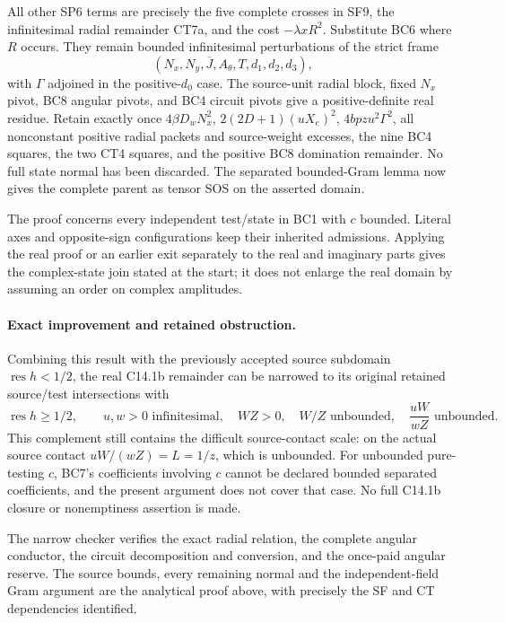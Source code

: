 All other SP6 terms are precisely the five complete crosses in SF9,
the infinitesimal radial remainder CT7a, and the cost
$-\lambda xR^2$. Substitute BC6 where $R$ occurs. They remain
bounded infinitesimal perturbations of the strict frame
\[
 (N_x,N_y,\overline J,A_\theta,T,d_1,d_2,d_3),
 \tag{BC10}
\]
with $\Gamma$ adjoined in the positive-$d_0$ case. The source-unit
radial block, fixed $N_x$ pivot, BC8 angular pivots, and BC4 circuit
pivots give a positive-definite real residue. Retain exactly once
$4\beta D_wN_x^2$, $2(2D+1)(uX_e)^2$, $4bpzu^2\Gamma^2$,
all nonconstant positive radial packets and source-weight excesses,
the nine BC4 squares, the two CT4 squares, and the positive BC8
domination remainder. No full state normal has been discarded.
The separated bounded-Gram lemma now gives the complete parent
as tensor SOS on the asserted domain.

The proof concerns every independent test/state in BC1 with $c$
bounded. Literal axes and opposite-sign configurations keep their
inherited admissions. Applying the real proof or an earlier exit
separately to the real and imaginary parts gives the complex-state
join stated at the start; it does not enlarge the real domain by
assuming an order on complex amplitudes.

\paragraph{Exact improvement and retained obstruction.}
Combining this result with the previously accepted source subdomain
$\operatorname{res}h<1/2$, the real C14.1b remainder can be narrowed
to its original retained source/test intersections with
\[
 \operatorname{res}h\ge1/2,\qquad
 u,w>0\text{ infinitesimal},\quad WZ>0,\quad W/Z\text{ unbounded},
 \quad \frac{uW}{wZ}\text{ unbounded}.
 \tag{BC11}
\]
This complement still contains the difficult source-contact scale:
on the actual source contact $uW/(wZ)=L=1/z$, which is unbounded.
For unbounded pure-testing $c$, BC7's coefficients involving $c$
cannot be declared bounded separated coefficients, and the present
argument does not cover that case. No full C14.1b closure or
nonemptiness assertion is made.

The narrow checker verifies the exact radial relation, the complete
angular conductor, the circuit decomposition and conversion, and
the once-paid angular reserve. The source bounds, every remaining
normal and the independent-field Gram argument are the analytical
proof above, with precisely the SF and CT dependencies identified.

